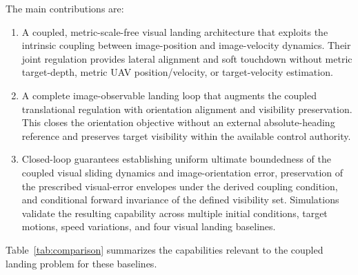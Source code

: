 \documentclass[10pt,conference]{IEEEtran}
\begin{document}
The main contributions are:
\begin{enumerate}
    \item A coupled, metric-scale-free visual landing architecture that exploits the intrinsic coupling between image-position and image-velocity dynamics. Their joint regulation provides lateral alignment and soft touchdown without metric target-depth, metric UAV position/velocity, or target-velocity estimation.
    \item A complete image-observable landing loop that augments the coupled translational regulation with orientation alignment and visibility preservation. This closes the orientation objective without an external absolute-heading reference and preserves target visibility within the available control authority.
    \item Closed-loop guarantees establishing uniform ultimate boundedness of the coupled visual sliding dynamics and image-orientation error, preservation of the prescribed visual-error envelopes under the derived coupling condition, and conditional forward invariance of the defined visibility set. Simulations validate the resulting capability across multiple initial conditions, target motions, speed variations, and four visual landing baselines.
\end{enumerate}

Table~\ref{tab:comparison} summarizes the capabilities relevant to the coupled landing problem for these baselines.
\end{document}
